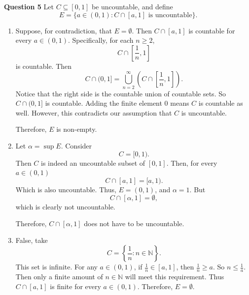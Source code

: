 \documentclass[12pt]{article}
\begin{document}
\noindent{} \textbf{Question 5}
Let $C \subseteq [0,1]$ be uncountable, and define
\[
    E = \{a \in (0,1) : C \cap [a,1] \text{ is uncountable}\}.
\]
\begin{enumerate}
    \item [(a)]
          Suppose, for contradiction, that $E = \emptyset$.
          Then $C \cap [a, 1]$ is countable for every $a \in (0,1)$.
          Specifically, for each $n \geq 2$,
          \[
              C \cap [\frac{1}{n}, 1]
          \]
          is countable.
          Then
          \[
              C \cap (0, 1] = \bigcup_{n=2}^{\infty} (C \cap [\frac{1}{n}, 1]).
          \]
          Notice that the right side is the countable union of countable sets.
          So $C \cap (0, 1]$ is countable.
          Adding the finite element $0$ means $C$ is countable as well.
          However, this contradicts our assumption that $C$ is uncountable.

          Therefore, $E$ is non-empty.

    \item [(b)]
          Let $\alpha = \sup E$.
          Consider
          \[
              C = [0, 1).
          \]
          Then $C$ is indeed an uncountable subset of $[0,1]$.
          Then, for every $a \in (0, 1)$
          \[
              C \cap [a, 1] = [a, 1).
          \]
          Which is also uncountable.
          Thus, $E = (0, 1)$, and $\alpha = 1$.
          But
          \[
              C \cap [\alpha, 1] = \emptyset,
          \]
          which is clearly not uncountable.

          Therefore, $C \cap [\alpha, 1]$ does not have to be uncountable.

    \item [(c)]
          False, take
          \[
              C = \left\{ \frac{1}{n} : n \in \mathbb{N} \right\}.
          \]
          This set is infinite.
          For any $a \in (0, 1)$, if $\frac{1}{n} \in [a, 1]$, then $\frac{1}{n} \geq a$.
          So $n \leq \frac{1}{a}$.
          Then only a finite amount of $n \in \mathbb{N}$ will meet this requirement.
          Thus $C \cap [a, 1]$ is finite for every $a \in (0,1)$.
          Therefore, $E = \emptyset$.
\end{enumerate}
\end{document}
